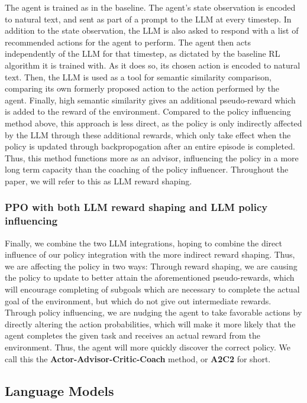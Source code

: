 \documentclass[conference]{IEEEtran}
\begin{document}
The agent is trained as in the baseline. The agent's state observation is encoded to natural text, and sent as part of a prompt to the LLM at every timestep. In addition to the state observation, the LLM is also asked to respond with a list of recommended actions for the agent to perform. The agent then acts independently of the LLM for that timestep, as dictated by the baseline RL algorithm it is trained with. As it does so, its chosen action is encoded to natural text. Then, the LLM is used as a tool for semantic similarity comparison, comparing its own formerly proposed action to the action performed by the agent. Finally, high semantic similarity gives an additional pseudo-reward which is added to the reward of the environment. Compared to the policy influencing method above, this approach is less direct, as the policy is only indirectly affected by the LLM through these additional rewards, which only take effect when the policy is updated through backpropogation after an entire episode is completed. Thus, this method functions more as an advisor, influencing the policy in a more long term capacity than the coaching of the policy influencer. Throughout the paper, we will refer to this as LLM reward shaping.

\subsubsection{PPO with both LLM reward shaping and LLM policy influencing}

Finally, we combine the two LLM integrations, hoping to combine the direct influence of our policy integration with the more indirect reward shaping. Thus, we are affecting the policy in two ways: Through reward shaping, we are causing the policy to update to better attain the aforementioned pseudo-rewards, which will encourage completing of subgoals which are necessary to complete the actual goal of the environment, but which do not give out intermediate rewards. Through policy influencing, we are nudging the agent to take favorable actions by directly altering the action probabilities, which will make it more likely that the agent completes the given task and receives an actual reward from the environment. Thus, the agent will more quickly discover the correct policy. We call this the \textbf{Actor-Advisor-Critic-Coach} method, or \textbf{A2C2} for short.


\subsection{Language Models}
\end{document}
